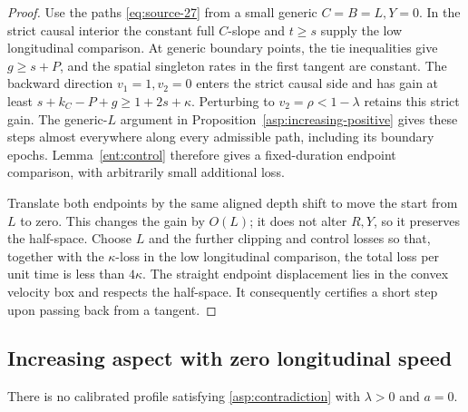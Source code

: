 \begin{proof}
Use the paths \eqref{eq:source-27} from a small generic
\(C=B=L,Y=0\). In the strict causal interior the constant
full \(C\)-slope and \(t\ge s\) supply the low longitudinal
comparison. At generic boundary points, the tie inequalities give
\(g\ge s+P\), and the spatial singleton rates in the first
tangent are constant. The backward direction \(v_1=1,v_2=0\)
enters the strict causal side and has gain at least
\(s+k_C-P+g\ge1+2s+\kappa\). Perturbing to
\(v_2=\rho<1-\lambda\) retains this strict gain.
The generic-\(L\) argument in Proposition~\ref{asp:increasing-positive}
gives these steps almost everywhere along every admissible path,
including its boundary epochs. Lemma~\ref{ent:control} therefore
gives a fixed-duration endpoint comparison, with arbitrarily small
additional loss.

Translate both endpoints by the same aligned depth shift to move
the start from \(L\) to zero. This changes the gain by \(O(L)\);
it does not alter \(R,Y\), so it preserves the half-space.
Choose \(L\) and the further clipping and control losses so that,
together with the \(\kappa\)-loss in the low longitudinal comparison,
the total loss per unit time is less than \(4\kappa\). The straight endpoint
displacement lies in the convex velocity box and respects the
half-space. It consequently certifies a short step upon passing
back from a tangent.
\end{proof}

\subsection{Increasing aspect with zero longitudinal speed}

\begin{proposition}\label{asp:increasing-zero}
There is no calibrated profile satisfying \eqref{asp:contradiction}
with \(\lambda>0\) and \(a=0\).
\end{proposition}

